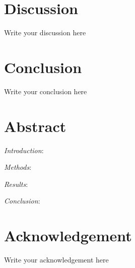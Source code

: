 \documentclass[
	    a4paper, 				%
	    bibliography=totocnumbered,		%
	    listof=totocnumbered,		%
	    11pt, 				%
]{scrreprt}
\begin{document}
	\chapter{Discussion}
		Write your discussion here
				
	\chapter{Conclusion}
		Write your conclusion here
		
	\chapter{Abstract}
		\textit{Introduction}: 
		\par 
		\textit{Methods}: 
		\par
		\textit{Results}: 
		\par
		\textit{Conclusion}: 



	\appendix
	\printbibliography
	\listoftables
	\listoffigures
	\printnomenclature
	\chapter{Acknowledgement}  
	Write your acknowledgement here
	
	
\end{document}
